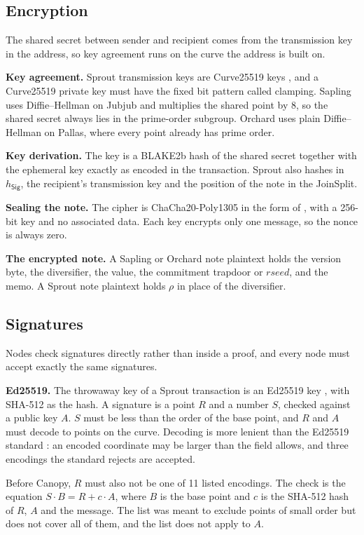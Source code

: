 \documentclass{article}
\let\oldcite\cite
\renewcommand{\cite}[2][]{\raisebox{0ex}{\oldcite[{#1}]{#2}}}
\newcommand{\lsubsection}[2]{\def\sectionlabel{#2} \subsection{#1}\label{#2}}
\theoremstyle{labelledtheorem} %
\begin{document}
\lsubsection{Encryption}{readablecipher}

The shared secret between sender and recipient comes from the transmission key in the address, so key agreement runs on the curve the address is built on.

\textbf{Key agreement.} Sprout transmission keys are Curve25519 keys \cite{Bernstein2006}, and a Curve25519 private key must have the fixed bit pattern called clamping. Sapling uses Diffie--Hellman on Jubjub and multiplies the shared point by 8, so the shared secret always lies in the prime-order subgroup. Orchard uses plain Diffie--Hellman on Pallas, where every point already has prime order.

\textbf{Key derivation.} The key is a BLAKE2b hash of the shared secret together with the ephemeral key exactly as encoded in the transaction. Sprout also hashes in $h_{\mathsf{Sig}}$, the recipient's transmission key and the position of the note in the JoinSplit.

\textbf{Sealing the note.} The cipher is ChaCha20-Poly1305 in the form of \cite{RFC-7539}, with a 256-bit key and no associated data. Each key encrypts only one message, so the nonce is always zero.

\textbf{The encrypted note.} A Sapling or Orchard note plaintext holds the version byte, the diversifier, the value, the commitment trapdoor or $\mathit{rseed}$, and the memo. A Sprout note plaintext holds $\rho$ in place of the diversifier.

\lsubsection{Signatures}{readablesignatures}

Nodes check signatures directly rather than inside a proof, and every node must accept exactly the same signatures.

\textbf{Ed25519.} The throwaway key of a Sprout transaction is an Ed25519 key \cite{BDLSY2012}, with SHA-512 as the hash. A signature is a point $R$ and a number $S$, checked against a public key $A$. $S$ must be less than the order of the base point, and $R$ and $A$ must decode to points on the curve. Decoding is more lenient than the Ed25519 standard \cite{RFC-8032}: an encoded coordinate may be larger than the field allows, and three encodings the standard rejects are accepted.

Before Canopy, $R$ must also not be one of 11 listed encodings. The check is the equation $S \cdot B = R + c \cdot A$, where $B$ is the base point and $c$ is the SHA-512 hash of $R$, $A$ and the message. The list was meant to exclude points of small order but does not cover all of them, and the list does not apply to $A$.
\end{document}
